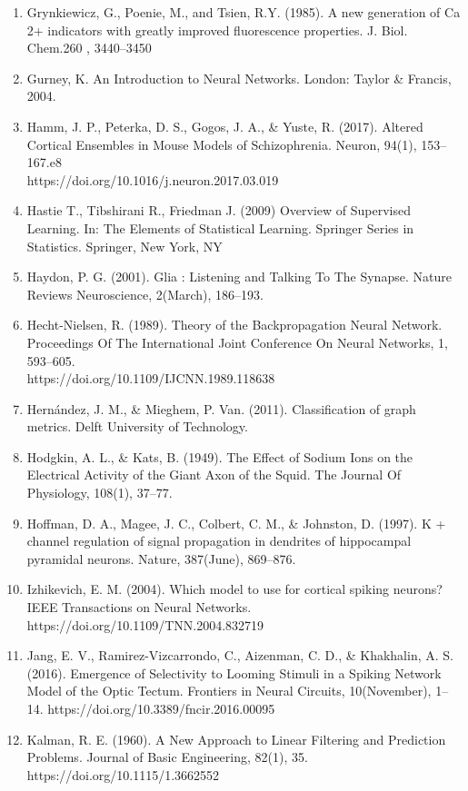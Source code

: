 \documentclass[11pt,titlepage]{article}
\begin{document}
\begin{spacing}{1}
\begin{enumerate}
\item Grynkiewicz, G., Poenie, M., and Tsien, R.Y. (1985). A new generation of Ca 2+ indicators with greatly improved fluorescence properties. J. Biol. Chem.260 , 3440–3450
\item Gurney, K. An Introduction to Neural Networks. London: Taylor \& Francis, 2004.
\item Hamm, J. P., Peterka, D. S., Gogos, J. A., \& Yuste, R. (2017). Altered Cortical Ensembles in Mouse Models of Schizophrenia. Neuron, 94(1), 153–167.e8\\https://doi.org/10.1016/j.neuron.2017.03.019
\item Hastie T., Tibshirani R., Friedman J. (2009) Overview of Supervised Learning. In: The Elements of Statistical Learning. Springer Series in Statistics. Springer, New York, NY
\item Haydon, P. G. (2001). Glia : Listening and Talking To The Synapse. Nature Reviews Neuroscience, 2(March), 186–193.
\item Hecht-Nielsen, R. (1989). Theory of the Backpropagation Neural Network. Proceedings Of The International Joint Conference On Neural Networks, 1, 593–605.\\https://doi.org/10.1109/IJCNN.1989.118638
\item Hernández, J. M., \& Mieghem, P. Van. (2011). Classification of graph metrics. Delft University of Technology.
\item Hodgkin, A. L., \& Kats, B. (1949). The Effect of Sodium Ions on the Electrical Activity of the Giant Axon of the Squid. The Journal Of Physiology, 108(1), 37–77.
\item Hoffman, D. A., Magee, J. C., Colbert, C. M., \& Johnston, D. (1997). K + channel regulation of signal propagation in dendrites of hippocampal pyramidal neurons. Nature, 387(June), 869–876.
\item Izhikevich, E. M. (2004). Which model to use for cortical spiking neurons? IEEE Transactions on Neural Networks. https://doi.org/10.1109/TNN.2004.832719
\item Jang, E. V., Ramirez-Vizcarrondo, C., Aizenman, C. D., \& Khakhalin, A. S. (2016). Emergence of Selectivity to Looming Stimuli in a Spiking Network Model of the Optic Tectum. Frontiers in Neural Circuits, 10(November), 1–14. https://doi.org/10.3389/fncir.2016.00095
\item Kalman, R. E. (1960). A New Approach to Linear Filtering and Prediction Problems. Journal of Basic Engineering, 82(1), 35. https://doi.org/10.1115/1.3662552

\end{enumerate}
\end{spacing}
\end{document}
